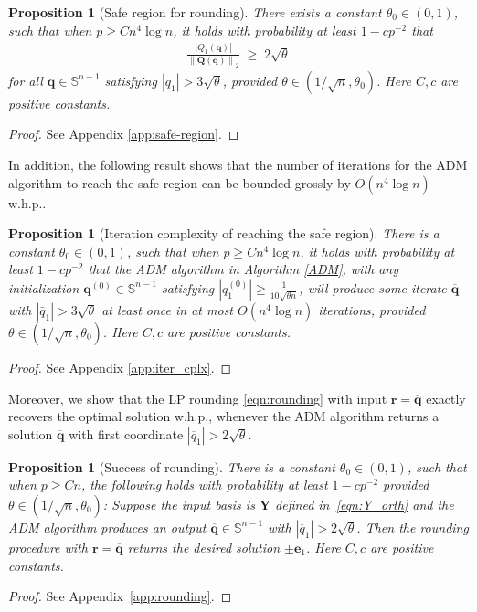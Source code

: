 \documentclass[11pt, journal, final]{IEEEtran}
\numberwithin{equation}{section}
\newtheorem{proposition}[theorem]{Proposition}
\newcommand{\mb}{\mathbf}
\newcommand{\bb}{\mathbb}
\newcommand{\norm}[1]{\left\lVert#1\right\rVert}
\newcommand{\ol}{\overline}
\newcommand{ \abs }[1]{\left| #1 \right|}
\newcommand{ \paren }[1]{ \left( #1 \right) }
\begin{document}
{\begin{proposition}[Safe region for rounding] \label{lem:safe}
There exists a constant $\theta_0 \in (0, 1)$, such that when $p \ge Cn^4 \log n$, it holds with probability at least $1 - cp^{-2}$ that
\begin{align*}
\frac{\abs{Q_1(\mb q)}}{\norm{\mb Q(\mb q)}_2} \; \geq \; 2\sqrt{\theta}
\end{align*}
for all $\mb q\in \bb S^{n-1}$ satisfying $\abs{q_1} > 3 \sqrt{\theta}$, provided $\theta\in \paren{1/\sqrt{n},\theta_0}$. Here $C, c$ are positive constants.
\end{proposition}
\begin{proof}
	See Appendix \ref{app:safe-region}.
\end{proof}
In addition, the following result shows that the number of iterations for the ADM algorithm to reach the safe region can be bounded grossly by $O(n^4\log n)$ w.h.p..
\begin{proposition}[Iteration complexity of reaching the safe region]\label{prop:iter-complexity}
There is a constant $\theta_0 \in (0, 1)$, such that when $p \ge Cn^4 \log n$, it holds with probability at least $1 -cp^{-2}$ that the ADM algorithm in Algorithm \ref{ADM}, with any initialization $\mb q^{(0)}\in \bb S^{n-1}$ satisfying $\abs{q_1^{(0)}}\geq \frac{1}{10\sqrt{\theta n}}$, will produce some iterate $\overline{\mb q}$ with $\abs{\bar{q}_1}> 3\sqrt{\theta} $ at least once in at most $O(n^4 \log n)$ iterations, provided $\theta \in \paren{1/\sqrt{n}, \theta_0 }$. Here $C, c$ are positive constants.
\end{proposition}
\begin{proof}
	See Appendix \ref{app:iter_cplx}.
\end{proof}
Moreover, we show that the LP rounding \eqref{eqn:rounding} with input $\mb r = \ol{\mb q}$ exactly recovers the optimal solution w.h.p., whenever the ADM algorithm returns a solution $\ol{\mb q}$ with first coordinate $\abs{\ol{q}_1}>2\sqrt{\theta}$.

\begin{proposition}[Success of rounding] \label{lem:rounding}
There is a constant $\theta_0 \in (0, 1)$, such that when $p \geq C n$, the following holds with probability at least $1 - cp^{-2}$ provided $\theta \in (1/\sqrt{n}, \theta_0)$: Suppose the input basis is $\mb Y$ defined in~\eqref{eqn:Y_orth} and the ADM algorithm produces an output $\ol{\mb q}\in \bb S^{n-1}$ with $|\overline{q}_1|>2\sqrt{\theta}$. Then the rounding procedure with $\mb r= \overline{\mb q}$ returns the desired solution $\pm \mb e_1$. Here $C, c$ are positive constants.
\end{proposition}
\begin{proof}
	See Appendix~\ref{app:rounding}.
\end{proof}

}
\end{document}
